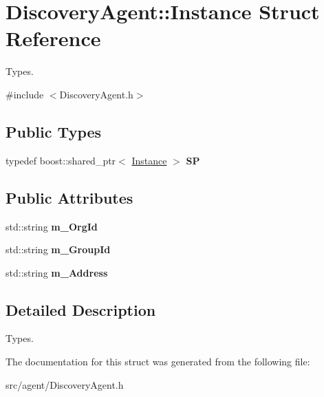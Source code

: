 \hypertarget{struct_discovery_agent_1_1_instance}{}\section{Discovery\+Agent\+:\+:Instance Struct Reference}
\label{struct_discovery_agent_1_1_instance}


Types.  




{\ttfamily \#include $<$Discovery\+Agent.\+h$>$}

\subsection*{Public Types}
\begin{DoxyCompactItemize}
\item 
\mbox{\label{struct_discovery_agent_1_1_instance_aa222e664761deb9b112b861c087ce31a}} 
typedef boost\+::shared\+\_\+ptr$<$ \hyperlink{struct_discovery_agent_1_1_instance}{Instance} $>$ {\bfseries SP}
\end{DoxyCompactItemize}
\subsection*{Public Attributes}
\begin{DoxyCompactItemize}
\item 
\mbox{\label{struct_discovery_agent_1_1_instance_a2150afa22268bc95c8d9e6e93bbb395f}} 
std\+::string {\bfseries m\+\_\+\+Org\+Id}
\item 
\mbox{\label{struct_discovery_agent_1_1_instance_acc2a36449878c8e9544638a8f125c193}} 
std\+::string {\bfseries m\+\_\+\+Group\+Id}
\item 
\mbox{\label{struct_discovery_agent_1_1_instance_a8b5e75eaef85260a8d078e9d39363f90}} 
std\+::string {\bfseries m\+\_\+\+Address}
\end{DoxyCompactItemize}


\subsection{Detailed Description}
Types. 

The documentation for this struct was generated from the following file\+:\begin{DoxyCompactItemize}
\item 
src/agent/Discovery\+Agent.\+h\end{DoxyCompactItemize}
